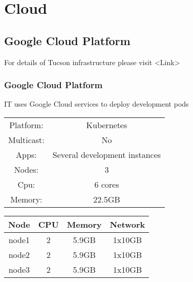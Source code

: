 \newpage
\section{Cloud}
\subsection{Google Cloud Platform}
For details of Tucson infrastructure please visit <Link>
\newpage
\subsubsection{Google Cloud Platform}
IT uses Google Cloud services to deploy development pods
\begin{center}
  \begin{tabular}{ |c|c| } 
   \hline
   Platform: & Kubernetes \\ 
   Multicast: & No \\ 
   Apps: & Several development instances \\ 
   Nodes: & 3 \\ 
   Cpu: & 6 cores \\ 
   Memory: & 22.5GB \\ 
   \hline
  \end{tabular}
\end{center}

\begin{center}
  \begin{tabular}{||c c c c||} 
    \hline
    Node & CPU & Memory & Network \\ [0.5ex] 
    \hline\hline
    node1 & 2 & 5.9GB & 1x10GB \\
    \hline
    node2 & 2 & 5.9GB & 1x10GB \\
    \hline
    node3 & 2 & 5.9GB & 1x10GB \\
    \hline
  \end{tabular}
\end{center}
